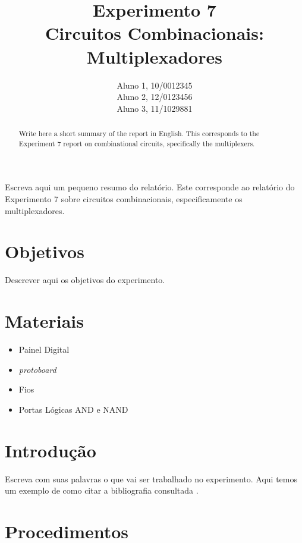 \documentclass[12pt]{article}
\title{Experimento 7\\ 
Circuitos Combinacionais: Multiplexadores}
\author{Aluno 1, 10/0012345\\
        Aluno 2,  12/0123456\\
        Aluno 3, 11/1029881
}
\begin{document}
 

\maketitle

 \begin{abstract}
   Write here a short summary of the report in English. This corresponds to the Experiment 7 report on combinational circuits, specifically the multiplexers.
 \end{abstract}
     
 \begin{resumo} 
  Escreva aqui um pequeno resumo do relatório. Este corresponde ao relatório do Experimento 7 sobre circuitos combinacionais, especificamente os multiplexadores.
 \end{resumo}


\section{Objetivos}
\label{sec:Objetivos}

Descrever aqui os objetivos do experimento.

\section{Materiais} 
\label{sec:Materiais}

\begin{itemize}
    \item Painel Digital
    
    \item \textit{protoboard}
    
    \item Fios
    
    \item Portas Lógicas AND e NAND
    
\end{itemize}


\section{Introdução}
\label{sec:Introducao}

Escreva com suas palavras o que vai ser trabalhado no experimento. Aqui temos um exemplo de como citar a bibliografia consultada \cite{boulic:91} \cite{smith:99}.

\section{Procedimentos}
\label{sec:Procedimentos}
\end{document}
